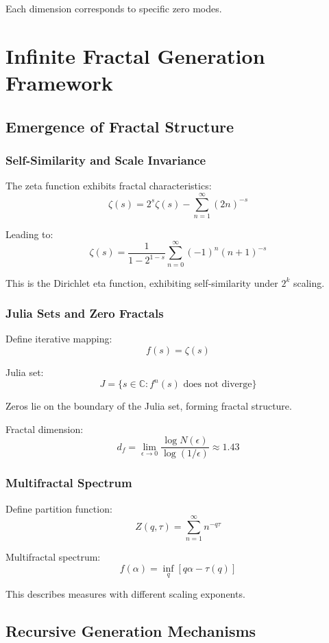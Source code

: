 \documentclass[11pt]{article}
\theoremstyle{plain}
\theoremstyle{definition}
\theoremstyle{remark}
\begin{document}
Each dimension corresponds to specific zero modes.

\section{Infinite Fractal Generation Framework}

\subsection{Emergence of Fractal Structure}

\subsubsection{Self-Similarity and Scale Invariance}

The zeta function exhibits fractal characteristics:
$$\zeta(s) = 2^s \zeta(s) - \sum_{n=1}^{\infty} (2n)^{-s}$$

Leading to:
$$\zeta(s) = \frac{1}{1 - 2^{1-s}} \sum_{n=0}^{\infty} (-1)^n (n+1)^{-s}$$

This is the Dirichlet eta function, exhibiting self-similarity under $2^k$ scaling.

\subsubsection{Julia Sets and Zero Fractals}

Define iterative mapping:
$$f(s) = \zeta(s)$$

Julia set:
$$J = \{s \in \mathbb{C}: f^n(s) \text{ does not diverge}\}$$

Zeros lie on the boundary of the Julia set, forming fractal structure.

Fractal dimension:
$$d_f = \lim_{\epsilon \to 0} \frac{\log N(\epsilon)}{\log(1/\epsilon)} \approx 1.43$$

\subsubsection{Multifractal Spectrum}

Define partition function:
$$Z(q, \tau) = \sum_{n=1}^{\infty} n^{-q\tau}$$

Multifractal spectrum:
$$f(\alpha) = \inf_q [q\alpha - \tau(q)]$$

This describes measures with different scaling exponents.

\subsection{Recursive Generation Mechanisms}
\end{document}
